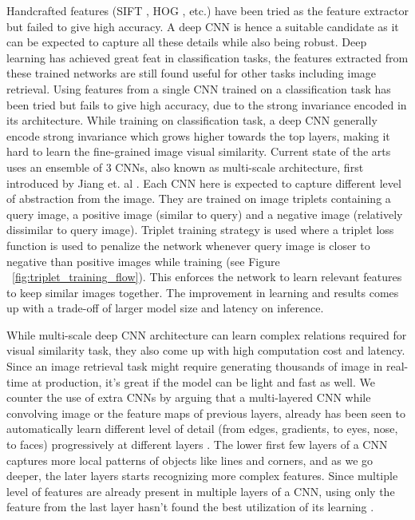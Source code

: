 \documentclass[10pt,twocolumn,letterpaper]{article}
\begin{document}
Handcrafted features (SIFT \cite{c12}, HOG \cite{c11}, etc.) have been tried as the feature extractor but failed to give high accuracy. A deep CNN is hence a suitable candidate as it can be expected to capture all these details while also being robust. Deep learning has achieved great feat in classification tasks, the features extracted from these trained networks are still found useful for other tasks including image retrieval. Using features from a single CNN trained on a classification task has been tried but fails to give high accuracy, due to the strong invariance encoded in its architecture. While training on classification task, a deep CNN generally encode strong invariance which grows higher towards the top layers, making it hard to learn the fine-grained image visual similarity. Current state of the arts uses an ensemble of 3 CNNs, also known as multi-scale architecture, first introduced by Jiang et. al \cite{c1}. Each CNN here is expected to capture different level of abstraction from the image. They are trained on image triplets containing a query image, a positive image (similar to query) and a negative image (relatively dissimilar to query image). Triplet training strategy is used where a triplet loss function is used to penalize the network whenever query image is closer to negative than positive images while training (see Figure ~\ref{fig:triplet_training_flow}). This enforces the network to learn relevant features to keep similar images together. The improvement in learning and results comes up with a trade-off of larger model size and latency on inference.

While multi-scale deep CNN architecture can learn complex relations required for visual similarity task, they also come up with high computation cost and latency. Since an image retrieval task might require generating thousands of image in real-time at production, it's great if the model can be light and fast as well. We counter the use of extra CNNs by arguing that a multi-layered CNN while convolving image or the feature maps of previous layers, already has been seen to automatically learn different level of detail (from edges, gradients, to eyes, nose, to faces) progressively at different layers \cite{c6}. The lower first few layers of a CNN captures more local patterns of objects like lines and corners, and as we go deeper, the later layers starts recognizing more complex features. Since multiple level of features are already present in multiple layers of a CNN, using only the feature from the last layer hasn't found the best utilization of its learning \cite{c7,c8,c9}.
\end{document}
